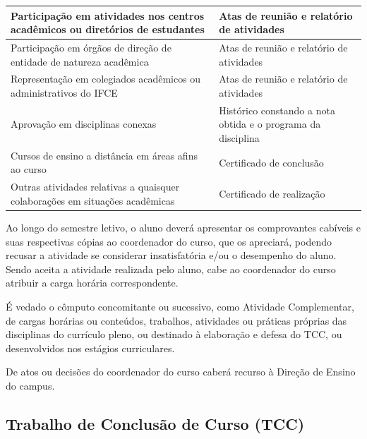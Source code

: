 \begin{longtable}{|p{8.5cm}|p{5.5cm}|}
	Participação em atividades nos centros acadêmicos ou diretórios de estudantes & Atas de reunião e relatório de atividades \\
	
	\hline
	
	Participação em órgãos de direção de entidade de natureza acadêmica & Atas de reunião e relatório de atividades \\
	
	\hline
	
	Representação em colegiados acadêmicos ou administrativos do IFCE & Atas de reunião e relatório de atividades \\
	
	\hline
	
	Aprovação em disciplinas conexas & Histórico constando a nota obtida e o programa da disciplina\\
	
	\hline
	
	Cursos de ensino a distância em áreas afins ao curso & Certificado de conclusão\\
	
	\hline
	
	Outras atividades relativas a quaisquer colaborações em situações acadêmicas & Certificado de realização\\
	
	\hline
	
\end{longtable} 

Ao longo do semestre letivo, o aluno deverá apresentar os comprovantes cabíveis e suas respectivas cópias ao coordenador do curso, que os apreciará, podendo recusar a atividade se considerar insatisfatória e/ou o desempenho do aluno. Sendo aceita a atividade realizada pelo aluno, cabe ao coordenador do curso atribuir a carga horária correspondente.


É vedado o cômputo concomitante ou sucessivo, como Atividade Complementar, de cargas horárias ou conteúdos, trabalhos, atividades ou práticas próprias das disciplinas do currículo pleno, ou destinado à elaboração e defesa do TCC, ou desenvolvidos nos estágios curriculares.

De atos ou decisões do coordenador do curso caberá recurso à Direção de Ensino do campus.

\subsection{Trabalho de Conclusão de Curso (TCC)}

